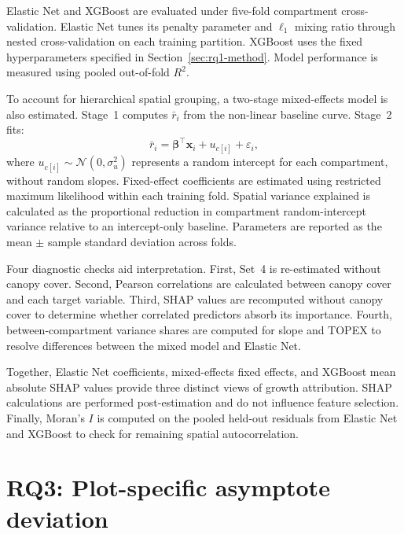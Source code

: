 \documentclass[logo,msc,ai]{infthesis}           %
\begin{document}
Elastic Net and XGBoost are evaluated under five-fold compartment cross-validation. Elastic Net tunes its penalty parameter and $\ell_1$ mixing ratio through nested cross-validation on each training partition. XGBoost uses the fixed hyperparameters specified in Section~\ref{sec:rq1-method}. Model performance is measured using pooled out-of-fold $R^2$.

To account for hierarchical spatial grouping, a two-stage mixed-effects model is also estimated. Stage~1 computes $\bar r_i$ from the non-linear baseline curve. Stage~2 fits:
\begin{equation}
\bar r_i=\boldsymbol{\beta}^{\top}\mathbf{x}_i+u_{c[i]}+\varepsilon_i,
\label{eq:mixed-effects}
\end{equation}
where $u_{c[i]}\sim\mathcal{N}(0,\sigma_u^2)$ represents a random intercept for each compartment, without random slopes. Fixed-effect coefficients are estimated using restricted maximum likelihood within each training fold. Spatial variance explained is calculated as the proportional reduction in compartment random-intercept variance relative to an intercept-only baseline. Parameters are reported as the mean $\pm$ sample standard deviation across folds.

Four diagnostic checks aid interpretation. First, Set~4 is re-estimated without canopy cover. Second, Pearson correlations are calculated between canopy cover and each target variable. Third, SHAP values are recomputed without canopy cover to determine whether correlated predictors absorb its importance. Fourth, between-compartment variance shares are computed for slope and TOPEX to resolve differences between the mixed model and Elastic Net.

Together, Elastic Net coefficients, mixed-effects fixed effects, and XGBoost mean absolute SHAP values provide three distinct views of growth attribution. SHAP calculations are performed post-estimation and do not influence feature selection. Finally, Moran's $I$ is computed on the pooled held-out residuals from Elastic Net and XGBoost to check for remaining spatial autocorrelation.

\section{RQ3: Plot-specific asymptote deviation}
\label{sec:rq3-method}
\end{document}
